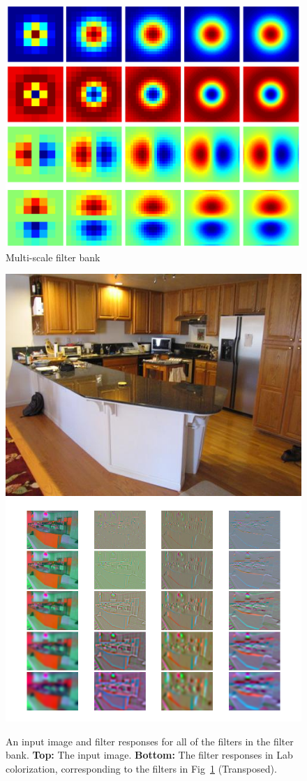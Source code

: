 \documentclass[11pt]{article}
\numberwithin{equation}{section} %
\numberwithin{figure}{section} %
\numberwithin{table}{section} %
\begin{document}
\begin{figure}
\centering
\includegraphics[width=.5\textwidth]{figures/filters.pdf}
\caption{Multi-scale filter bank}
\label{fig:fb}
\end{figure}

\begin{figure}[h]
  \centering
  \includegraphics[width=.5\textwidth]{./figures/example_filter.jpg}
  \includegraphics[width=.6\textwidth]{./figures/filters.png}
  \caption{An input image and filter responses for all of the filters in the filter bank. \textbf{Top:} The input image. 
    \textbf{Bottom:} The filter responses in Lab colorization, corresponding to the filters in Fig~\ref{fig:fb} (Transposed).}
  \label{fig:filter_resp}
\end{figure}

\end{document}
